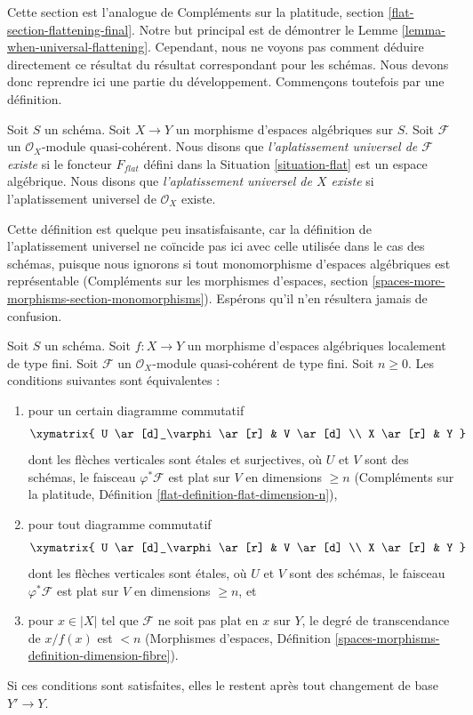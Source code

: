 \noindent
Cette section est l'analogue de
Compléments sur la platitude, section \ref{flat-section-flattening-final}.
Notre but principal est de démontrer le
Lemme \ref{lemma-when-universal-flattening}.
Cependant, nous ne voyons pas comment déduire directement ce résultat
du résultat correspondant pour les schémas.
Nous devons donc reprendre ici une partie du développement.
Commençons toutefois par une définition.

\begin{definition}
\label{definition-flattening}
Soit $S$ un schéma.
Soit $X \to Y$ un morphisme d'espaces algébriques sur $S$.
Soit $\mathcal{F}$ un $\mathcal{O}_X$-module quasi-cohérent.
Nous disons que {\it l'aplatissement universel de $\mathcal{F}$ existe}
si le foncteur $F_{flat}$ défini dans la Situation \ref{situation-flat}
est un espace algébrique.
Nous disons que {\it l'aplatissement universel de $X$ existe}
si l'aplatissement universel de $\mathcal{O}_X$ existe.
\end{definition}

\noindent
Cette définition est quelque peu insatisfaisante, car la définition de
l'aplatissement universel ne coïncide pas ici avec celle utilisée dans le
cas des schémas, puisque nous ignorons si tout monomorphisme d'espaces
algébriques est représentable (Compléments sur les morphismes d'espaces,
section \ref{spaces-more-morphisms-section-monomorphisms}).
Espérons qu'il n'en résultera jamais de confusion.

\begin{lemma}
\label{lemma-pre-flat-dimension-n}
Soit $S$ un schéma.
Soit $f : X \to Y$ un morphisme d'espaces algébriques
localement de type fini.
Soit $\mathcal{F}$ un $\mathcal{O}_X$-module quasi-cohérent de
type fini. Soit $n \geq 0$. Les conditions suivantes sont équivalentes :
\begin{enumerate}
\item pour un certain diagramme commutatif
$$
\xymatrix{
U \ar[d]_\varphi \ar[r] & V \ar[d] \\
X \ar[r] & Y
}
$$
dont les flèches verticales sont \'etales et surjectives, où $U$ et $V$ sont
des schémas, le faisceau $\varphi^*\mathcal{F}$ est plat sur $V$
en dimensions $\geq n$ (Compléments sur la platitude, Définition
\ref{flat-definition-flat-dimension-n}),
\item pour tout diagramme commutatif
$$
\xymatrix{
U \ar[d]_\varphi \ar[r] & V \ar[d] \\
X \ar[r] & Y
}
$$
dont les flèches verticales sont \'etales, où $U$ et $V$ sont des schémas,
le faisceau $\varphi^*\mathcal{F}$ est plat sur $V$ en dimensions $\geq n$, et
\item pour $x \in |X|$ tel que $\mathcal{F}$ ne soit pas plat en $x$
sur $Y$, le degré de transcendance de $x/f(x)$ est $< n$ (Morphismes d'espaces,
Définition \ref{spaces-morphisms-definition-dimension-fibre}).
\end{enumerate}
Si ces conditions sont satisfaites, elles le restent après tout changement de base $Y' \to Y$.
\end{lemma}

